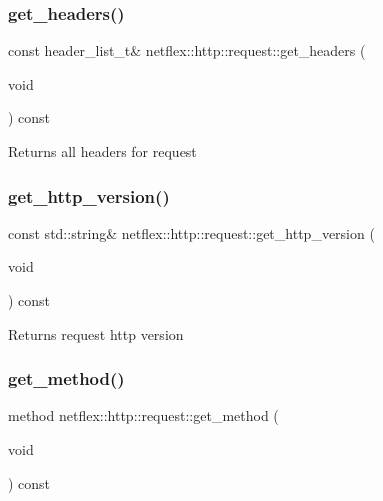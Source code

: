 \subsubsection{\texorpdfstring{get\+\_\+headers()}{get\_headers()}}
{\footnotesize\ttfamily const header\+\_\+list\+\_\+t\& netflex\+::http\+::request\+::get\+\_\+headers (\begin{DoxyParamCaption}\item[{void}]{ }\end{DoxyParamCaption}) const}

\begin{DoxyReturn}{Returns}
all headers for request 
\end{DoxyReturn}
\mbox{\label{classnetflex_1_1http_1_1request_ab0cabbb537eb7470d06f4c8039d0e7cb}} 
\subsubsection{\texorpdfstring{get\+\_\+http\+\_\+version()}{get\_http\_version()}}
{\footnotesize\ttfamily const std\+::string\& netflex\+::http\+::request\+::get\+\_\+http\+\_\+version (\begin{DoxyParamCaption}\item[{void}]{ }\end{DoxyParamCaption}) const}

\begin{DoxyReturn}{Returns}
request http version 
\end{DoxyReturn}
\mbox{\label{classnetflex_1_1http_1_1request_a465930c432dc303f6767858e971eda56}} 
\subsubsection{\texorpdfstring{get\+\_\+method()}{get\_method()}}
{\footnotesize\ttfamily method netflex\+::http\+::request\+::get\+\_\+method (\begin{DoxyParamCaption}\item[{void}]{ }\end{DoxyParamCaption}) const}

